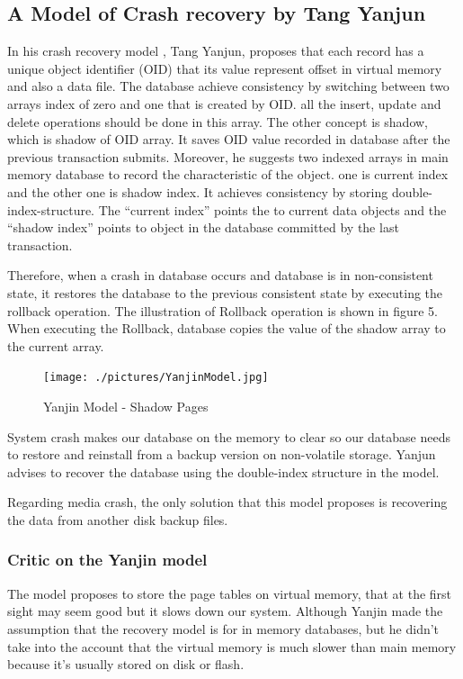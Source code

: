 \documentclass[12pt]{article} %
\begin{document}
\subsection{A Model of Crash recovery by Tang Yanjun }

In his crash recovery model \cite{yanjunmodel}, Tang Yanjun, proposes that each record has a unique object identifier (OID) that its value represent offset in virtual memory and also a data file. The database achieve consistency by switching between two arrays index of zero and one that is created by OID. all the insert, update and delete operations should be done in this array. The other concept is shadow, which is shadow of OID array. It saves OID value recorded in database after the previous transaction submits. Moreover, he suggests two indexed arrays in main memory database to record the characteristic of the object. one is current index and the other one is shadow index. It achieves consistency by storing double-index-structure. The ``current index'' points the to current data objects and the ``shadow index'' points to object in the database committed by the last transaction.

Therefore, when a crash in database occurs and database is in non-consistent state, it restores the database to the previous consistent state by executing the rollback operation. The illustration of Rollback operation is shown in figure 5. When executing the Rollback, database copies the value of the shadow array to the current array.

\begin{figure}
\centering
\texttt{[image: ./pictures/YanjinModel.jpg]}
\caption{Yanjin Model - Shadow Pages}
\label{fig:YanjinModel}
\end{figure}

System crash makes our database on the memory to clear so our database needs to restore and reinstall from a backup version on non-volatile storage. Yanjun advises to recover the database using the double-index structure in the model.

Regarding media crash, the only solution that this model proposes is recovering the data from another disk backup files.

\subsubsection{Critic on the Yanjin model}

The model proposes to store the page tables on virtual memory, that at the first sight may seem good but it slows down our system. Although Yanjin made the assumption that the recovery model is for in memory databases, but he didn't take into the account that the virtual memory is much slower than main memory because it's usually stored on disk or flash.
\end{document}
